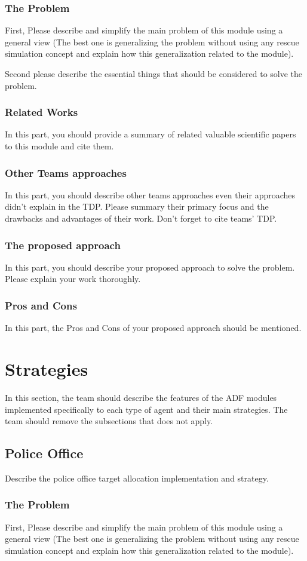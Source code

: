 \documentclass[runningheads,a4paper]{llncs}
\begin{document}
\subsubsection{The Problem}
First, Please describe and simplify the main problem of this module using a general view (The best one is generalizing the problem without using any rescue simulation concept and explain how this generalization related to the module).

Second please describe the essential things that should be considered to solve the problem.
\subsubsection{Related Works}
In this part, you should provide a summary of related valuable scientific papers to this module and cite them.
\subsubsection{Other Teams approaches}
In this part, you should describe other teams approaches even their approaches didn't explain in the TDP. Please summary their primary focus and the drawbacks and advantages of their work. Don't forget to cite teams' TDP.
\subsubsection{The proposed approach}
In this part, you should describe your proposed approach to solve the problem. Please explain your work thoroughly.
\subsubsection{Pros and Cons}
In this part, the Pros and Cons of your proposed approach should be mentioned.


\section{Strategies}
In this section, the team should describe the features of the ADF modules
implemented specifically to each type of agent and their main strategies. The
team should remove the subsections that does not apply.
\subsection{Police Office}
Describe the police office target allocation implementation and strategy.
\subsubsection{The Problem}
First, Please describe and simplify the main problem of this module using a general view (The best one is generalizing the problem without using any rescue simulation concept and explain how this generalization related to the module).
\end{document}
